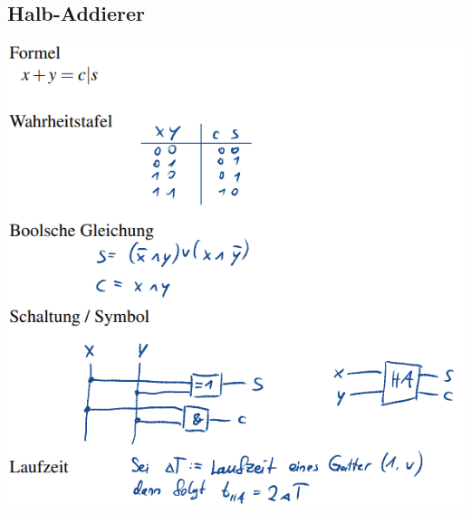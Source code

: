 \documentclass[12pt,a4paper]{article}
\begin{document}
	\begin{minipage}[t]{0.5\textwidth}
		\subsection{Halb-Addierer}
		\includegraphics[width=\textwidth]{Bilder/halbaddiere.PNG}
	\end{minipage}
\end{document}
